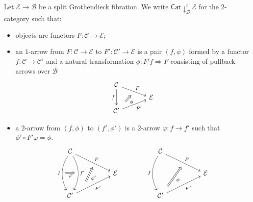 \documentclass[a4paper,10pt
,draft
]{article}%
\renewcommand{\1}{\eta}%
\begin{document}
\begin{definition}
Let $\mathcal{E} \to \mathcal{B}$ be a split Grothendieck fibration.
We write $\mathsf{Cat}\downarrow^r_{\mathcal{B}} \mathcal{E}$ for the $2$-category such that:
\begin{itemize}
	\item objects are functors $F \colon \mathcal{C} \to \mathcal{E}$; 
	
	\item an $1$-arrow from 
	$F \colon \mathcal{C} \to \mathcal{E}$
	to
	$F' \colon \mathcal{C}' \to \mathcal{E}$
	is a pair $(f,\phi)$
	formed by a functor $f\colon \mathcal{C} \to \mathcal{C}'$ and a natural transformation $\phi \colon F' f \Rightarrow F$ consisting of pullback arrows over $\mathcal{B}$
		\begin{equation}
		\begin{tikzcd}[row sep = tiny, column sep = 35pt]
			\mathcal{C} \arrow{dr}[name=U]{F} \arrow{dd}[swap]{f}
		\\
			& \mathcal{E}
		\\
			|[alias=V]| \mathcal{C}' \arrow{ur}[swap]{F'}
		\arrow[Rightarrow, from=V, to=U,shorten >=0.25cm,shorten <=0.25cm
		,swap,"\phi"
		]
		\end{tikzcd}
		\end{equation}
	\item a $2$-arrow from $(f,\phi)$ to $(f',\phi')$ is a $2$-arrow $\varphi \colon f \to f'$ such that
	$\phi' \circ F' \varphi = \phi$.
		\begin{equation}
		\begin{tikzcd}[column sep = 50pt]
			\mathcal{C} \arrow{dr}[name=U]{F} 
			\arrow[bend right]{dd}[swap]{f}[name=F]{}
			\arrow[bend left]{dd}{f'}[swap,name=FF]{}
			&
		&
			\mathcal{C} \arrow{dr}[name=U2]{F} 
			\arrow[bend right]{dd}[swap]{f}
			&
		\\
			& \mathcal{E}
		&
			& \mathcal{E}
		\\
			\mathcal{C}' \arrow{ur}[swap]{F'}[near start, name=V]{}
			&
		&
			|[alias=V2]| \mathcal{C}' \arrow{ur}[swap]{F'}
			&
		\arrow[Rightarrow, from=V, to=U,shorten >=0.25cm,shorten <=0.25cm
		,swap,"\phi'"
		]
		\arrow[Rightarrow, from=F, to=FF,shorten >=0.0cm,shorten <=0.0cm
		,swap,"\varphi"
		]
		\arrow[Rightarrow, from=V2, to=U2,shorten >=0.25cm,shorten <=0.25cm
		,swap,"\phi"
		]
		\end{tikzcd}
		\end{equation}
\end{itemize}
\end{definition}
\end{document}
